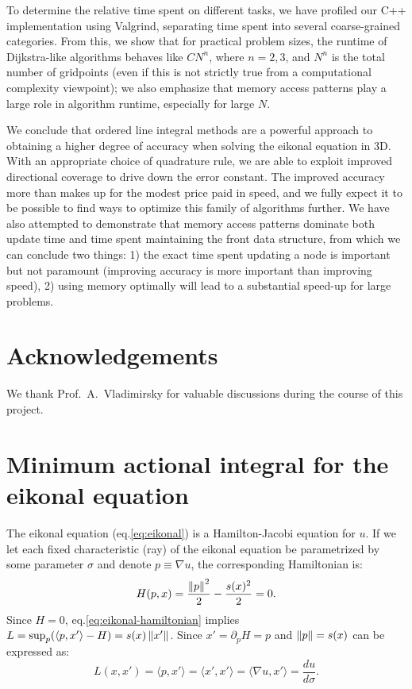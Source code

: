 \documentclass[smallcondensed]{svjour3}
\begin{document}
To determine the relative time spent on different tasks, we have
profiled our C++ implementation using Valgrind, separating time spent
into several coarse-grained categories. From this, we show that for
practical problem sizes, the runtime of Dijkstra-like algorithms
behaves like $C N^n$, where $n = 2, 3$, and $N^n$ is the total number
of gridpoints (even if this is not strictly true from a computational
complexity viewpoint); we also emphasize that memory access patterns
play a large role in algorithm runtime, especially for large $N$.

We conclude that ordered line integral methods are a powerful approach
to obtaining a higher degree of accuracy when solving the eikonal
equation in 3D. With an appropriate choice of quadrature rule, we are
able to exploit improved directional coverage to drive down the error
constant. The improved accuracy more than makes up for the modest
price paid in speed, and we fully expect it to be possible to find
ways to optimize this family of algorithms further. We have also
attempted to demonstrate that memory access patterns dominate both
update time and time spent maintaining the front data structure, from
which we can conclude two things: 1) the exact time spent updating a
node is important but not paramount (improving accuracy is more
important than improving speed), 2) using memory optimally will lead
to a substantial speed-up for large problems.

\section{Acknowledgements}

We thank Prof.\ A.\ Vladimirsky for valuable discussions during the
course of this project.

\appendix

\section[Minimum action integral]{Minimum actional integral for the
  eikonal equation}\label{sec:minimum-action-integral} The eikonal
equation (eq.\@ \ref{eq:eikonal}) is a Hamilton-Jacobi equation for
$u$. If we let each fixed characteristic (ray) of the eikonal equation
be parametrized by some parameter $\sigma$ and denote
$p \equiv \nabla u$, the corresponding Hamiltonian is:
\begin{equation}
  \label{eq:eikonal-hamiltonian}
  H{(p, x)} = \frac{\left\|p\right\|^2}{2} - \frac{s(x)^2}{2} = 0.
\end{equation}
Since $H = 0$, eq.\@ \ref{eq:eikonal-hamiltonian} implies
$L = \sup_p (\langle p, x' \rangle - H) = s(x) \left\|x'\right\|$. Since
$x' = \partial_p H = p$ and $\left\|p\right\| = s(x)$ can be expressed as:
\begin{equation}
  \label{eq:eikonal-lagrangian}
  L(x, x') = \langle p, x'\rangle = \langle x', x'\rangle = \langle \nabla u, x' \rangle = \frac{du}{d\sigma}.
\end{equation}
\end{document}
